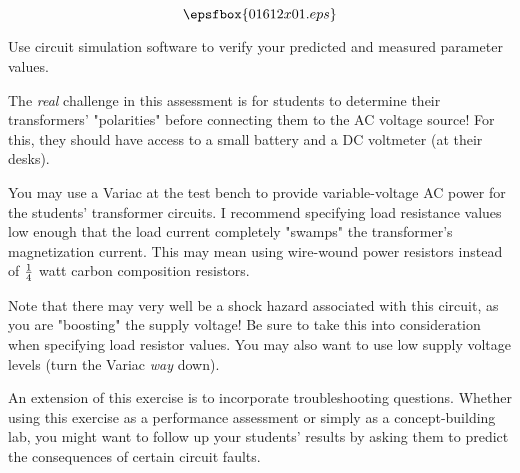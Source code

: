 

$$\epsfbox{01612x01.eps}$$

\vfil \eject






Use circuit simulation software to verify your predicted and measured parameter values.







The {\it real} challenge in this assessment is for students to determine their transformers' "polarities" before connecting them to the AC voltage source!  For this, they should have access to a small battery and a DC voltmeter (at their desks).

You may use a Variac at the test bench to provide variable-voltage AC power for the students' transformer circuits.  I recommend specifying load resistance values low enough that the load current completely "swamps" the transformer's magnetization current.  This may mean using wire-wound power resistors instead of $1 \over 4$ watt carbon composition resistors.

Note that there may very well be a shock hazard associated with this circuit, as you are "boosting" the supply voltage!  Be sure to take this into consideration when specifying load resistor values.  You may also want to use low supply voltage levels (turn the Variac {\it way} down).

An extension of this exercise is to incorporate troubleshooting questions.  Whether using this exercise as a performance assessment or simply as a concept-building lab, you might want to follow up your students' results by asking them to predict the consequences of certain circuit faults.





